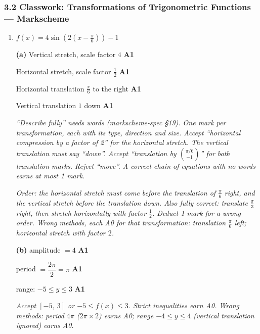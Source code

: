 \documentclass[12pt, twoside]{article}
\begin{document}
\subsubsection*{3.2 Classwork: Transformations of Trigonometric Functions --- Markscheme}

\begin{enumerate}[itemsep=0.3cm]

\item[1.] [Maximum mark: 10]

$f(x) = 4\sin\!\left(2\left(x - \frac{\pi}{6}\right)\right) - 1$

\textbf{(a)} Vertical stretch, scale factor $4$ \hfill \textbf{A1}

Horizontal stretch, scale factor $\frac{1}{2}$ \hfill \textbf{A1}

Horizontal translation $\frac{\pi}{6}$ to the right \hfill \textbf{A1}

Vertical translation $1$ down \hfill \textbf{A1}

\emph{``Describe fully'' needs words (markscheme-spec \S19). One mark per
transformation, each with its type, direction and size. Accept
``horizontal compression by a factor of 2'' for the horizontal stretch.
The vertical translation must say ``down''. Accept
``translation by $\binom{\pi/6}{-1}$'' for both translation marks.
Reject ``move''. A correct chain of equations with no words earns at most
1 mark.}

\emph{Order: the horizontal stretch must come before the translation of
$\frac{\pi}{6}$ right, and the vertical stretch before the translation
down. Also fully correct: translate $\frac{\pi}{3}$ right, then stretch
horizontally with factor $\frac{1}{2}$. Deduct 1 mark for a wrong order.
Wrong methods, each A0 for that transformation: translation
$\frac{\pi}{6}$ left; horizontal stretch with factor $2$.}

\textbf{(b)} amplitude $= 4$ \hfill \textbf{A1}

period $= \dfrac{2\pi}{2} = \pi$ \hfill \textbf{A1}

range: $-5 \le y \le 3$ \hfill \textbf{A1}

\emph{Accept $[-5,\ 3]$ or $-5 \le f(x) \le 3$. Strict inequalities earn
A0. Wrong methods: period $4\pi$ ($2\pi \times 2$) earns A0; range
$-4 \le y \le 4$ (vertical translation ignored) earns A0.}


\end{enumerate}
\end{document}
